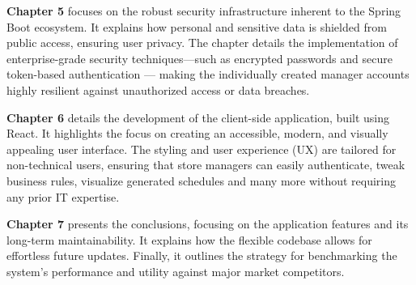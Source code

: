 \vspace{1.5em}

\noindent\textbf {Chapter 5} focuses on the robust security infrastructure inherent to the Spring Boot ecosystem.
It explains how personal and sensitive data is shielded from public access, ensuring user privacy.
The chapter details the implementation of enterprise-grade security techniques—such as encrypted passwords and secure token-based authentication — making the individually created manager accounts highly resilient against unauthorized access or data breaches.

\vspace{1.5em}

\noindent\textbf {Chapter 6} details the development of the client-side application, built using React.
It highlights the focus on creating an accessible, modern, and visually appealing user interface.
The styling and user experience (UX) are tailored for non-technical users, ensuring that store managers can easily authenticate, tweak business rules, visualize generated schedules and many more without requiring any prior IT expertise.

\vspace{1.5em}

\noindent\textbf {Chapter 7} presents the conclusions, focusing on the application features and its long-term maintainability.
It explains how the flexible codebase allows for effortless future updates.
Finally, it outlines the strategy for benchmarking the system's performance and utility against major market competitors.

\vspace{2em} %

